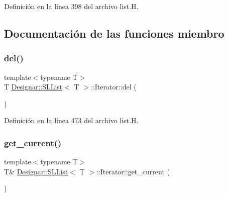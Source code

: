 Definición en la línea 398 del archivo list.\+H.



\subsection{Documentación de las funciones miembro}
\mbox{\label{class_designar_1_1_s_l_list_1_1_iterator_ae9fc8898009213695804526b4fe8c2cb}} 
\subsubsection{\texorpdfstring{del()}{del()}}
{\footnotesize\ttfamily template$<$typename T$>$ \\
T \hyperlink{class_designar_1_1_s_l_list}{Designar\+::\+S\+L\+List}$<$ T $>$\+::Iterator\+::del (\begin{DoxyParamCaption}{ }\end{DoxyParamCaption})\hspace{0.3cm}{\ttfamily [inline]}}



Definición en la línea 473 del archivo list.\+H.

\mbox{\label{class_designar_1_1_s_l_list_1_1_iterator_a4986f4352424c32e5518ce1435474f0b}} 
\subsubsection{\texorpdfstring{get\+\_\+current()}{get\_current()}\hspace{0.1cm}{\footnotesize\ttfamily [1/2]}}
{\footnotesize\ttfamily template$<$typename T$>$ \\
T\& \hyperlink{class_designar_1_1_s_l_list}{Designar\+::\+S\+L\+List}$<$ T $>$\+::Iterator\+::get\+\_\+current (\begin{DoxyParamCaption}{ }\end{DoxyParamCaption})\hspace{0.3cm}{\ttfamily [inline]}}



